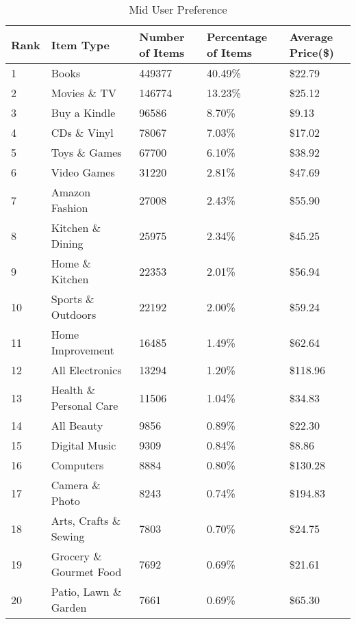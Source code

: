 \begin{table}[!ht]
\centering
\caption{Mid User Preference}
\begin{adjustbox}{max width=.5\textwidth}
\begin{tabular}{lllll}
Rank & Item Type          & Number of Items & Percentage of Items & Average Price(\$) \\ \hline
1 & Books & 449377 & 40.49\% & \$22.79 \\
2 & Movies \& TV & 146774 & 13.23\% & \$25.12 \\
3 & Buy a Kindle & 96586 & 8.70\% & \$9.13 \\
4 & CDs \& Vinyl & 78067 & 7.03\% & \$17.02 \\
5 & Toys \& Games & 67700 & 6.10\% & \$38.92 \\
6 & Video Games & 31220 & 2.81\% & \$47.69 \\
7 & Amazon Fashion & 27008 & 2.43\% & \$55.90 \\
8 & Kitchen \& Dining & 25975 & 2.34\% & \$45.25 \\
9 & Home \& Kitchen & 22353 & 2.01\% & \$56.94 \\
10 & Sports \& Outdoors & 22192 & 2.00\% & \$59.24 \\
11 & Home Improvement & 16485 & 1.49\% & \$62.64 \\
12 & All Electronics & 13294 & 1.20\% & \$118.96 \\
13 & Health \& Personal Care & 11506 & 1.04\% & \$34.83 \\
14 & All Beauty & 9856 & 0.89\% & \$22.30 \\
15 & Digital Music & 9309 & 0.84\% & \$8.86 \\
16 & Computers & 8884 & 0.80\% & \$130.28 \\
17 & Camera \& Photo & 8243 & 0.74\% & \$194.83 \\
18 & Arts, Crafts \& Sewing & 7803 & 0.70\% & \$24.75 \\
19 & Grocery \& Gourmet Food & 7692 & 0.69\% & \$21.61 \\
20 & Patio, Lawn \& Garden & 7661 & 0.69\% & \$65.30 \\
\end{tabular}
\end{adjustbox}
\end{table}
